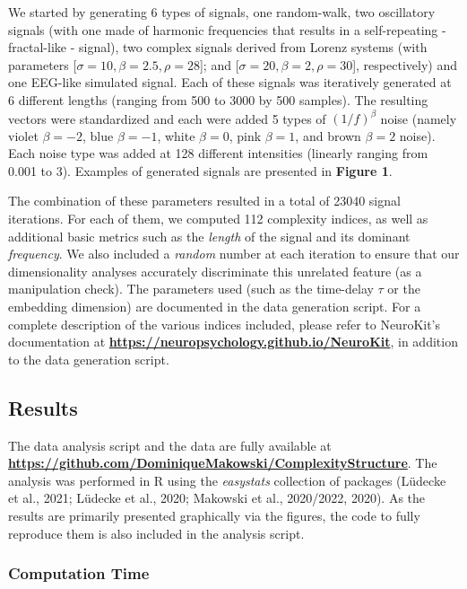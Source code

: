 \documentclass[
  man]{apa6}
\begin{document}
We started by generating 6 types of signals, one random-walk, two oscillatory signals (with one made of harmonic frequencies that results in a self-repeating - fractal-like - signal), two complex signals derived from Lorenz systems (with parameters {[}\(\sigma = 10, \beta = 2.5, \rho = 28\){]}; and {[}\(\sigma = 20, \beta = 2, \rho = 30\){]}, respectively) and one EEG-like simulated signal. Each of these signals was iteratively generated at 6 different lengths (ranging from 500 to 3000 by 500 samples). The resulting vectors were standardized and each were added 5 types of \((1/f)^\beta\) noise (namely violet \(\beta=-2\), blue \(\beta=-1\), white \(\beta=0\), pink \(\beta=1\), and brown \(\beta=2\) noise). Each noise type was added at 128 different intensities (linearly ranging from 0.001 to 3). Examples of generated signals are presented in \textbf{Figure 1}.

The combination of these parameters resulted in a total of 23040 signal iterations. For each of them, we computed 112 complexity indices, as well as additional basic metrics such as the \emph{length} of the signal and its dominant \emph{frequency}. We also included a \emph{random} number at each iteration to ensure that our dimensionality analyses accurately discriminate this unrelated feature (as a manipulation check). The parameters used (such as the time-delay \(\tau\) or the embedding dimension) are documented in the data generation script. For a complete description of the various indices included, please refer to NeuroKit's documentation at \textbf{\url{https://neuropsychology.github.io/NeuroKit}}, in addition to the data generation script.

\hypertarget{results}{%
\subsection{Results}\label{results}}

The data analysis script and the data are fully available at \textbf{\url{https://github.com/DominiqueMakowski/ComplexityStructure}}. The analysis was performed in R using the \emph{easystats} collection of packages (Lüdecke et al., 2021; Lüdecke et al., 2020; Makowski et al., 2020/2022, 2020). As the results are primarily presented graphically via the figures, the code to fully reproduce them is also included in the analysis script.

\hypertarget{computation-time}{%
\subsubsection{Computation Time}\label{computation-time}}
\end{document}
